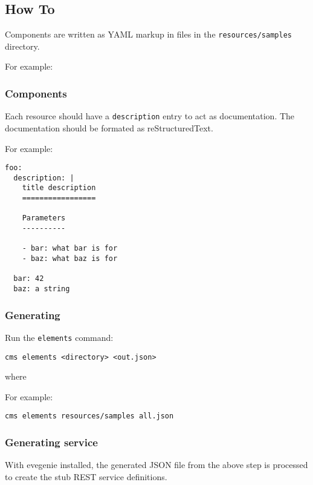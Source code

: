 \subsection{How To}

Components are written as YAML markup in files in the
\verb+resources/samples+ directory.

For example:


\subsubsection{Components}

Each resource should have a \verb+description+ entry to act as
documentation. The documentation should be formated as  reStructuredText.

For example:

\begin{verbatim}
foo:
  description: |
    title description
    =================

    Parameters
    ----------

    - bar: what bar is for
    - baz: what baz is for

  bar: 42
  baz: a string
\end{verbatim}


\subsubsection{Generating}

Run the \verb+elements+ command:

\begin{verbatim}
cms elements <directory> <out.json>
\end{verbatim}

where



For example:

\begin{verbatim}
cms elements resources/samples all.json
\end{verbatim}


\subsubsection{Generating service}

With evegenie installed, the generated JSON file from the above step
is processed to create the stub REST service definitions.
